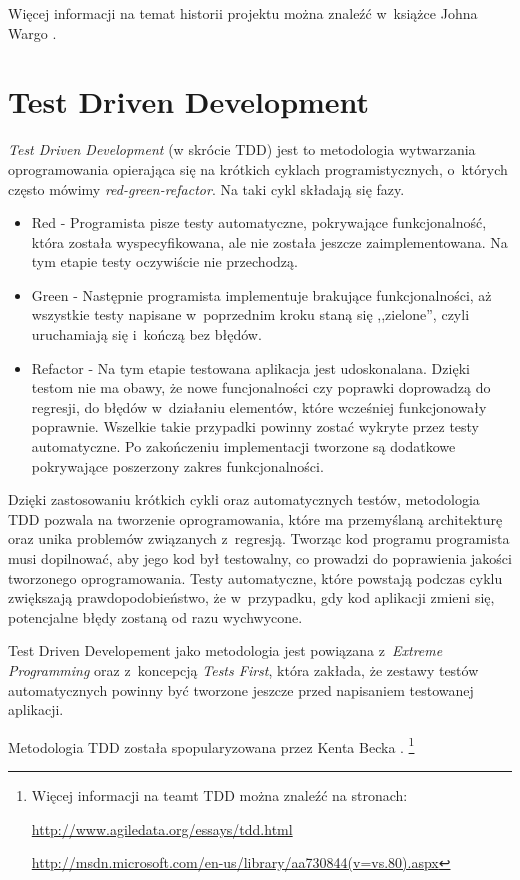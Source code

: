 \documentclass[brudnopis]{xmgr}
\begin{document}
Więcej informacji na temat historii projektu można znaleźć w~książce Johna Wargo \cite{Wargo}. 

\section{Test Driven Development}

\textit{Test Driven Development} (w skrócie TDD) jest to metodologia wytwarzania oprogramowania opierająca się na krótkich cyklach programistycznych, o~których często mówimy \textit{red-green-refactor}. Na taki cykl składają się fazy.
\begin{itemize}
  \item Red - Programista pisze testy automatyczne, pokrywające funkcjonalność, która została wyspecyfikowana, ale nie została jeszcze zaimplementowana. Na tym etapie testy oczywiście nie przechodzą.
  \item Green - Następnie programista implementuje brakujące funkcjonalności, aż wszystkie testy napisane w~poprzednim kroku staną się ,,zielone'', czyli uruchamiają się i~kończą bez błędów.
  \item Refactor - Na tym etapie testowana aplikacja jest udoskonalana. Dzięki testom nie ma obawy, że nowe funcjonalności czy poprawki doprowadzą do regresji, do błędów w~działaniu elementów, które wcześniej funkcjonowały poprawnie. Wszelkie takie przypadki powinny zostać wykryte przez testy automatyczne. Po zakończeniu implementacji tworzone są dodatkowe pokrywające poszerzony zakres funkcjonalności.
\end{itemize}

Dzięki zastosowaniu krótkich cykli oraz automatycznych testów, metodologia TDD pozwala na tworzenie oprogramowania, które ma przemyślaną architekturę oraz unika problemów związanych z~regresją. Tworząc kod  programu programista musi dopilnować, aby jego kod był testowalny, co prowadzi do poprawienia jakości tworzonego oprogramowania. Testy automatyczne, które powstają podczas cyklu zwiększają prawdopodobieństwo, że w~przypadku, gdy kod aplikacji zmieni się, potencjalne błędy zostaną od razu wychwycone. 

Test Driven Developement jako metodologia jest powiązana z~\textit{Extreme Programming} oraz z~koncepcją \textit{Tests First}, która zakłada, że zestawy testów automatycznych powinny być tworzone jeszcze przed napisaniem testowanej aplikacji.

Metodologia TDD została spopularyzowana przez Kenta Becka \cite{Beck}.
\footnote{
Więcej informacji na teamt TDD można znaleźć na stronach:

\url{http://www.agiledata.org/essays/tdd.html}

\url{http://msdn.microsoft.com/en-us/library/aa730844(v=vs.80).aspx}
}
\end{document}
